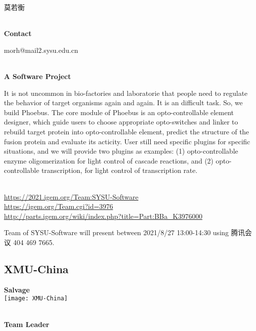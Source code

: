   莫若衡


\textbf{\\Contact}

  morh@mail2.sysu.edu.cn


\textbf{\\A Software Project\\}\begin{spacing}{1.5}

It is not uncommon in bio-factories and laboratorie that people need to regulate the behavior of target organisms again and again. It is an difficult task. So, we build Phoebus. The core module of Phoebus is an opto-controllable element designer, which guide users to choose appropriate opto-switches and linker to rebuild target protein into opto-controllable element, predict the structure of the fusion protein and evaluate its acticity. User still need specific plugins for specific situations, and we will provide two plugins as examples: (1) opto-controllable enzyme oligomerization for light control of cascade reactions, and (2) opto-controllable transcription, for light control of transcription rate.\end{spacing}
\\

\url{https://2021.igem.org/Team:SYSU-Software }\\
\url{https://igem.org/Team.cgi?id=3976 }\\
\url{http://parts.igem.org/wiki/index.php?title=Part:BBa_K3976000 }\\


\vfill{}









Team of SYSU-Software will present between 2021/8/27 13:00-14:30        using 腾讯会议 404 469 7665.
\newpage


\subsection{\textcolor{Blu}{ XMU-China } }
\vspace{5mm}
\begin{center}
\large{
  \textbf{ Salvage }\\

  \texttt{[image: XMU-China]}
}
\end{center}
\textbf{\\Team Leader}

